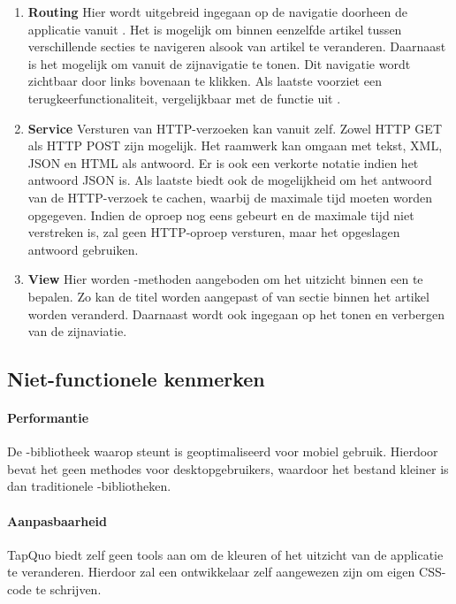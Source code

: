 \begin{enumerate}
\item \textbf{Routing }
Hier wordt uitgebreid ingegaan op de navigatie doorheen de applicatie vanuit \js{}.
Het is mogelijk om binnen eenzelfde artikel tussen verschillende secties te navigeren alsook van artikel te veranderen.
Daarnaast is het mogelijk om vanuit \js{} de zijnavigatie te tonen.
Dit navigatie wordt zichtbaar door links bovenaan te klikken.
Als laatste voorziet \lungo{} een terugkeerfunctionaliteit, vergelijkbaar met de functie  uit \js{}.

\item \textbf{Service }
Versturen van HTTP-verzoeken kan vanuit \lungo{} zelf.
Zowel HTTP GET als HTTP POST zijn mogelijk.
Het raamwerk kan omgaan met tekst, XML, JSON en HTML als antwoord.
Er is ook een verkorte notatie indien het antwoord JSON is.
Als laatste biedt \lungo{} ook de mogelijkheid om het antwoord van de HTTP-verzoek te cachen, waarbij de maximale tijd moeten worden opgegeven.
Indien de oproep nog eens gebeurt en de maximale tijd niet verstreken is, zal \lungo{} geen HTTP-oproep versturen, maar het opgeslagen antwoord gebruiken.

\item \textbf{View }
Hier worden \js{}-methoden aangeboden om het uitzicht binnen een  te bepalen.
Zo kan de titel worden aangepast of van sectie binnen het artikel worden veranderd.
Daarnaast wordt ook ingegaan op het tonen en verbergen van de zijnaviatie.
 
\end{enumerate}

\subsection{Niet-functionele kenmerken}
\paragraph{Performantie}
De \js{}-bibliotheek waarop \lungo{} steunt is geoptimaliseerd voor mobiel gebruik.
Hierdoor bevat het geen methodes voor desktopgebruikers, waardoor het bestand kleiner is dan traditionele \js{}-bibliotheken.

\paragraph{Aanpasbaarheid}
\label{sec:lungo-aanpasbaarheid}
TapQuo biedt zelf geen tools aan om de kleuren of het uitzicht van de applicatie te veranderen.
Hierdoor zal een ontwikkelaar zelf aangewezen zijn om eigen CSS-code te schrijven.

